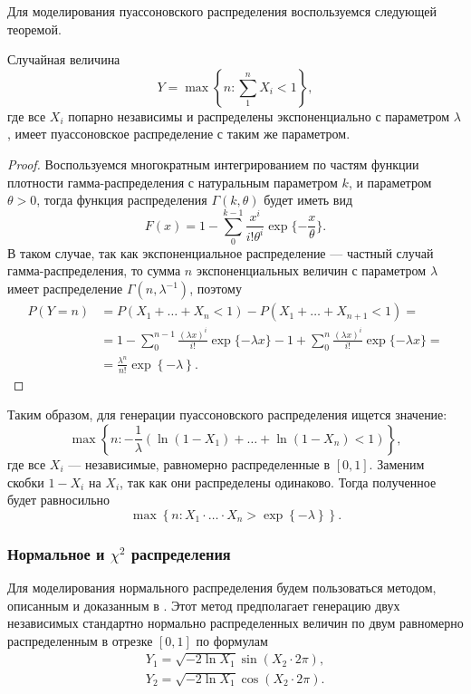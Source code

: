 \documentclass[12pt, a4paper]{article}
\begin{document}
Для моделирования пуассоновского распределения воспользуемся следующей теоремой.
\begin{theorem}
Случайная величина \[Y = \max\left\{n\colon \sum\limits_1^n X_i < 1 \right\},\]
где все $X_i$ попарно независимы и распределены экспоненциально с параметром $\lambda$, имеет пуассоновское распределение с таким же параметром.
\end{theorem}
\begin{proof}
Воспользуемся многократным интегрированием по частям функции плотности гамма-распределения с натуральным параметром $k$, и параметром $\theta > 0$, тогда функция распределения $\Gamma(k,\theta)$ будет иметь вид \[ F(x) = 1 - \sum\limits_0^{k-1} \frac{x^i}{i!\theta^i}\exp\{-\frac{x}{\theta}\}  .\]
В таком случае, так как экспоненциальное распределение --- частный случай гамма-распределения, то сумма $n$ экспоненциальных величин с параметром $\lambda$ имеет распределение $\Gamma(n,\lambda^{-1})$, поэтому
\begin{align*}
P(Y = n) &= P(X_1+\ldots+X_n < 1) - P(X_1+\ldots+X_{n+1} < 1) = \\ 
& = 1 - \sum\limits_0^{n-1} \frac{(\lambda x)^i}{i!}\exp\{-\lambda x\} -
    1 + \sum\limits_0^{n} \frac{(\lambda x)^i}{i!}\exp\{-\lambda x\} = \\
&   =\frac{\lambda^n}{n!}\exp \left\{ -\lambda \right\}.
\end{align*}
\end{proof}
Таким образом, для генерации пуассоновского распределения ищется значение:
\[\max\left\{n\colon -\frac 1\lambda\left(\ln(1-X_1)+\ldots+\ln(1-X_n)<1\right)\right\},\]
где все $X_i$ --- независимые, равномерно распределенные в $[0,1]$.
Заменим скобки $1-X_i$ на $X_i$, так как они распределены одинаково. Тогда полученное будет равносильно
\[ \max\left\{n\colon X_1\cdot\ldots\cdot X_n > \exp\left\{ -\lambda \right\}\right\}.\]

\subsubsection{Нормальное и $\chi^2$ распределения}
Для моделирования нормального распределения будем пользоваться методом, описанным и доказанным в \cite{Box_Muller}. Этот метод предполагает генерацию двух независимых стандартно нормально распределенных величин по двум равномерно распределенным в отрезке $[0,1]$ по формулам
\begin{align*}
Y_1 = \sqrt{ -2\ln X_1 } \sin(X_2\cdot 2\pi), \\
Y_2 = \sqrt{ -2\ln X_1 } \cos(X_2\cdot 2\pi).
\end{align*}
\end{document}
